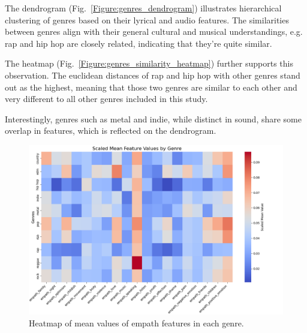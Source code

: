 The dendrogram (Fig.~\ref{Figure:genres_dendrogram}) illustrates hierarchical clustering of genres based on their
lyrical and audio features. The similarities between genres align with their
general cultural and musical understandings, e.g. rap and hip hop are closely
related, indicating that they're quite similar. 

The heatmap (Fig.~\ref{Figure:genres_similarity_heatmap}) further supports this observation. The euclidean distances of rap
and hip hop with other genres stand out as the highest, meaning that those two
genres are similar to each other and very different to all other genres
included in this study. 

Interestingly, genres such as metal and indie, while
distinct in sound, share some overlap in features, which is reflected on the
dendrogram.


\begin{center}
\begin{figure}[H]
  \centering
  \includegraphics[width=6in]{img/heatmap_of_empath.png}
  \caption{Heatmap of mean values of empath features in each genre.}
  \label{Figure:heatmap_empath}
\end{figure}
\end{center}

